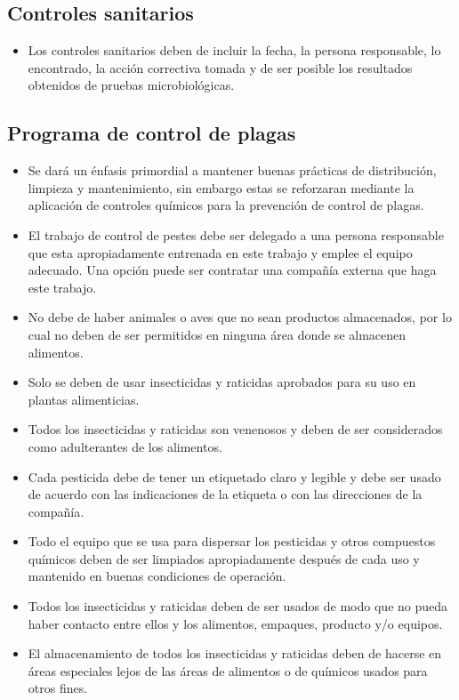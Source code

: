 \subsection{Controles sanitarios}
\begin{itemize}
	\item Los controles sanitarios deben de incluir la fecha, la persona responsable, lo encontrado, la acción correctiva tomada y de ser posible los resultados obtenidos de pruebas microbiológicas.
\end{itemize}

\subsection{Programa de control de plagas}
\begin{itemize}
	\item Se dará un énfasis primordial a mantener buenas prácticas de distribución, limpieza y mantenimiento, sin embargo estas se reforzaran mediante la aplicación de controles químicos para la prevención de control de plagas.
	\item El trabajo de control de pestes debe ser delegado a una persona responsable que esta apropiadamente entrenada en este trabajo y emplee el equipo adecuado. Una opción puede ser contratar una compañía externa que haga este trabajo.
	\item No debe de haber animales o aves que no sean productos almacenados, por lo cual no deben de ser permitidos en ninguna área donde se almacenen alimentos.
	\item Solo se deben de usar insecticidas y raticidas aprobados para su uso en plantas alimenticias.
	\item Todos los insecticidas y raticidas son venenosos y deben de ser considerados como adulterantes de los alimentos.
	\item Cada pesticida debe de tener un etiquetado claro y legible y debe ser usado de acuerdo con las indicaciones de la etiqueta o con las direcciones de la compañía.
	\item Todo el equipo que se usa para dispersar los pesticidas y otros compuestos químicos deben de ser limpiados apropiadamente después de cada uso y mantenido en buenas condiciones de operación.
	\item Todos los insecticidas y raticidas deben de ser usados de modo que no pueda haber contacto entre ellos y los alimentos, empaques, producto y/o equipos.
	\item El almacenamiento de todos los insecticidas y raticidas deben de hacerse en áreas especiales lejos de las áreas de alimentos o de químicos usados para otros fines.
\end{itemize}

